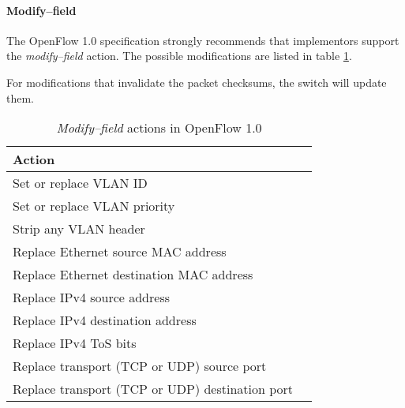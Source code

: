 \paragraph{Modify--field}

The OpenFlow 1.0 specification strongly recommends that implementors support
the {\em modify--field} action.  The possible modifications are listed in
table \ref{table:openflow-1.0.mods}.

For modifications that invalidate the packet checksums, the switch will
update them.

\begin{table}
\begin{tabular}{|l|l|}
\hline \textbf{Action} \\
\hline Set or replace VLAN ID \\
\hline Set or replace VLAN priority \\
\hline Strip any VLAN header \\
\hline Replace Ethernet source MAC address \\
\hline Replace Ethernet destination MAC address \\
\hline Replace IPv4 source address \\
\hline Replace IPv4 destination address \\
\hline Replace IPv4 \ac{ToS} bits \\
\hline Replace transport (TCP or UDP) source port \\
\hline Replace transport (TCP or UDP) destination port \\
\hline
\end{tabular}
\caption{{\em Modify--field} actions in OpenFlow 1.0}
\label{table:openflow-1.0.mods}
\end{table}
